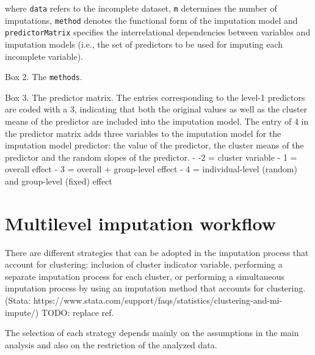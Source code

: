 \documentclass[
  article]{jss}
\begin{document}
where \texttt{data} refers to the incomplete dataset, \texttt{m}
determines the number of imputations, \texttt{method} denotes the
functional form of the imputation model and \texttt{predictorMatrix}
specifies the interrelational dependencies between variables and
imputation models (i.e., the set of predictors to be used for imputing
each incomplete variable).

\begin{tcolorbox}[enhanced jigsaw, bottomrule=.15mm, breakable, toprule=.15mm, rightrule=.15mm, arc=.35mm, left=2mm, leftrule=.75mm, colback=white, opacityback=0]

Box 2. The \texttt{methods}.

\end{tcolorbox}

\begin{tcolorbox}[enhanced jigsaw, bottomrule=.15mm, breakable, toprule=.15mm, rightrule=.15mm, arc=.35mm, left=2mm, leftrule=.75mm, colback=white, opacityback=0]

Box 3. The predictor matrix. The entries corresponding to the level-1
predictors are coded with a 3, indicating that both the original values
as well as the cluster means of the predictor are included into the
imputation model. The entry of 4 in the predictor matrix adds three
variables to the imputation model for the imputation model predictor:
the value of the predictor, the cluster means of the predictor and the
random slopes of the predictor. - -2 = cluster variable - 1 = overall
effect - 3 = overall + group-level effect - 4 = individual-level
(random) and group-level (fixed) effect

\end{tcolorbox}

\hypertarget{sec-workflow}{%
\section{Multilevel imputation workflow}\label{sec-workflow}}

There are different strategies that can be adopted in the imputation
process that account for clustering: inclusion of cluster indicator
variable, performing a separate imputation process for each cluster, or
performing a simultaneous imputation process by using an imputation
method that accounts for clustering.(Stata:
https://www.stata.com/support/faqs/statistics/clustering-and-mi-impute/)
TODO: replace ref.

The selection of each strategy depends mainly on the assumptions in the
main analysis and also on the restriction of the analyzed data.
\end{document}
